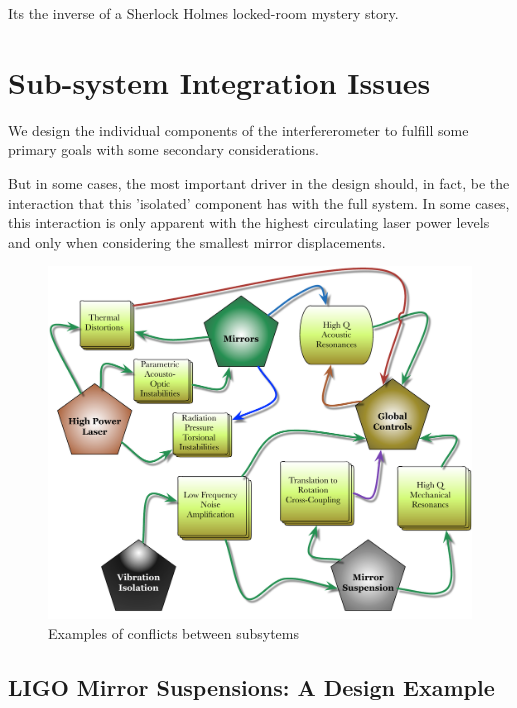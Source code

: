 Its the inverse of a Sherlock Holmes locked-room mystery story.


\section{Sub-system Integration Issues}
We design the individual components of the interfererometer to fulfill some primary goals with some secondary considerations.

But in some cases, the most important driver in the design should, in fact, be the interaction that this 'isolated' component has with the full system. In some cases, this interaction is only apparent with the highest circulating laser power levels and only when considering the smallest mirror displacements.


\begin{figure}[h]
\centering
\includegraphics[width=\columnwidth]{Figures/SystemConflicts.pdf}
\caption{Examples of conflicts between subsytems}
\label{fig:SystemConflicts}
\end{figure}

\subsection{LIGO Mirror Suspensions: A Design Example}

